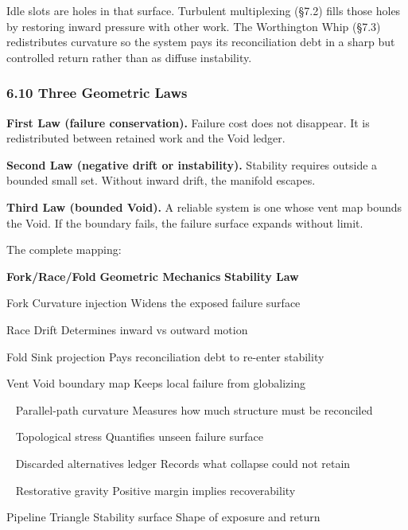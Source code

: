 \documentclass[
]{article}
\begin{document}
Idle slots are holes in that surface. Turbulent multiplexing (§7.2)
fills those holes by restoring inward pressure with other work. The
Worthington Whip (§7.3) redistributes curvature so the system pays its
reconciliation debt in a sharp but controlled return rather than as
diffuse instability.

\subsubsection{\texorpdfstring{\textbf{6.10 Three Geometric
Laws}}{6.10 Three Geometric Laws}}\label{three-geometric-laws}

\textbf{First Law (failure conservation).} Failure cost does not
disappear. It is redistributed between retained work and the Void
ledger.

\textbf{Second Law (negative drift or instability).} Stability requires
outside a bounded small set. Without inward drift, the manifold escapes.

\textbf{Third Law (bounded Void).} A reliable system is one whose vent
map bounds the Void. If the boundary fails, the failure surface expands
without limit.

The complete mapping:

\textbf{Fork/Race/Fold} \textbar{} \textbf{Geometric Mechanics}
\textbar{} \textbf{Stability Law} \textbar{}

Fork \textbar{} Curvature injection \textbar{} Widens the exposed
failure surface \textbar{}

Race \textbar{} Drift \textbar{} Determines inward vs outward motion
\textbar{}

Fold \textbar{} Sink projection \textbar{} Pays reconciliation debt to
re-enter stability \textbar{}

Vent \textbar{} Void boundary map \textbar{} Keeps local failure from
globalizing \textbar{}

~\textbar{} Parallel-path curvature \textbar{} Measures how much
structure must be reconciled \textbar{}

~\textbar{} Topological stress \textbar{} Quantifies unseen failure
surface \textbar{}

~\textbar{} Discarded alternatives ledger \textbar{} Records what
collapse could not retain \textbar{}

~\textbar{} Restorative gravity \textbar{} Positive margin implies
recoverability \textbar{}

Pipeline Triangle \textbar{} Stability surface \textbar{} Shape of
exposure and return \textbar{}
\end{document}
